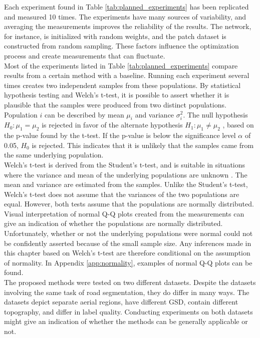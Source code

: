 Each experiment found in Table \ref{tab:planned_experiments} has been replicated and measured 10 times. The experiments have many sources of variability, and averaging the measurements improves the reliability of the results. The network, for instance, is initialized with random weights, and the patch dataset is constructed from random sampling. These factors influence the optimization process and create measurements that can fluctuate.\\

Most of the experiments listed in Table \ref{tab:planned_experiments} compare results from a certain method with a baseline. Running each experiment several times creates two independent samples from these populations. By statistical hypothesis testing and Welch's t-test, it is possible to assert whether it is plausible that the samples were produced from two distinct populations. Population $i$ can be described by mean $\mu_i$ and variance $\sigma^2_i$. The null hypothesis $H_0\colon \mu_1 = \mu_2$ is rejected in favor of the alternate hypothesis $H_1\colon\mu_1 \neq \mu_2$ , based on the p-value found by the t-test.  If the p-value is below the significance level $\alpha$ of 0.05, $H_0$ is rejected. This indicates that it is unlikely that the samples came from the same underlying population.\\

Welch's t-test is derived from the Student's t-test, and is suitable in situations where the variance and mean of the underlying populations are unknown \citep{walpole_probability}. The mean and variance are estimated from the samples. Unlike the Student's t-test, Welch's t-test does not assume that the variances of the two populations are equal. However, both tests assume that the populations are normally distributed. Visual interpretation of normal Q-Q plots created from the measurements can give an indication of whether the populations are normally distributed. Unfortunately, whether or not the underlying populations were normal could not be confidently asserted because of the small sample size. Any inferences made in this chapter based on Welch's t-test are therefore conditional on the assumption of normality. In Appendix \ref{app:normality}, examples of normal Q-Q plots can be found.\\ 
 
The proposed methods were tested on two different datasets. Despite the datasets involving the same task of road segmentation, they do differ in many ways. The datasets depict separate aerial regions, have different \ac{GSD}, contain different topography, and differ in label quality. Conducting experiments on both datasets might give an indication of whether the methods can be generally applicable or not.\\

